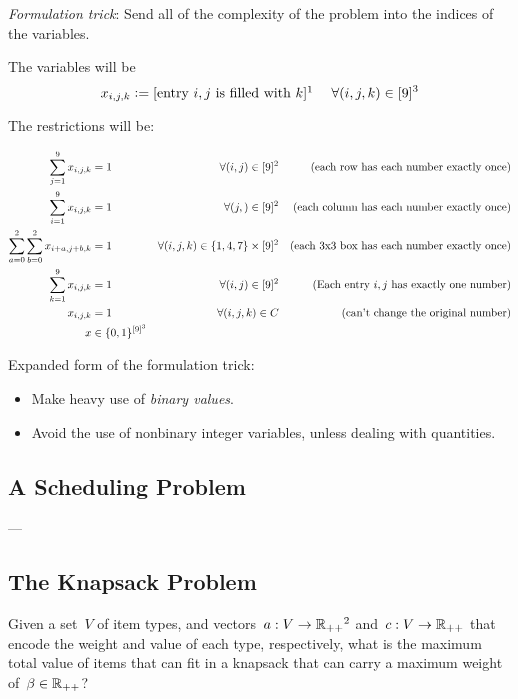 \documentclass[main.tex]{subfiles}
\begin{document}
\emph{Formulation trick}: Send all of the complexity of the problem into the indices of the variables.

The variables will be
$$x_{i, j, k} \coloneqq [\text{entry } i, j \text{ is filled with } k]\footnotemark \hspace{13pt} \forall (i, j, k) \in [9]^3 $$


The restrictions will be:

\begin{align*}
\sum\limits_{j=1}^9{x_{i,j,k}} &= 1 &\forall (i, j) \in [9]^2 & & \text{(each row has each number exactly once)} \\
\sum\limits_{i=1}^9{x_{i,j,k}} &= 1 &\forall (j, ) \in [9]^2 &  & \text{(each column has each number exactly once)} \\
\sum\limits_{a=0}^2{\sum\limits_{b=0}^2{x_{i+a,j+b,k}}} &= 1 &\forall (i, j, k) \in \{1, 4, 7\} \times [9]^2 & & \text{(each 3x3 box has each number exactly once)} \\
\sum\limits_{k=1}^9{x_{i,j,k}} &= 1 &\forall (i, j) \in [9]^2 & & \text{(Each entry $i, j$ has exactly one number)} \\
x_{i,j,k} &= 1 & \forall (i, j, k) \in C & & \text{(can't change the original number)} \\
x &\in \{0, 1\}^{[9]^3}
\end{align*}

Expanded form of the formulation trick:
\begin{itemize}
\item Make heavy use of \emph{binary values}.
\item Avoid the use of nonbinary integer variables, unless dealing with quantities.
\end{itemize}

\subsection*{A Scheduling Problem}
---

\subsection*{The Knapsack Problem}
Given a set~$V$ of item types, and vectors~${a : V \rightarrow \Rpp\footnotemark}$ and~${c: V \rightarrow \mathbb{R}_{++}}$ that encode the weight and value of each type, respectively, what is the maximum total value of items that can fit in a knapsack that can carry a maximum weight of~${\beta \in \mathbb{R}_{++}}$?
\end{document}
